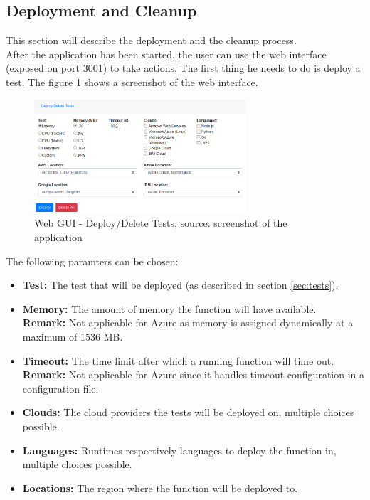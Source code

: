\subsection{Deployment and Cleanup}
This section will describe the deployment and the cleanup process.\\
After the application has been started, the user can use the web interface (exposed on port 3001) to take actions. The first thing he needs to do is deploy a test. The figure \ref{fig:ui} shows a screenshot of the web interface.

\begin{figure}[htp]
\begin{center}
\includegraphics[width=0.7\textwidth]{bilder/ui.png}
\captionsetup{justification=centering, labelfont=bf}
\caption[Web GUI - Deploy/Delete Tests]{Web GUI - Deploy/Delete Tests, source: screenshot of the application}
\label{fig:ui}
\end{center}
\end{figure}

The following paramters can be chosen:
\begin{itemize}
    \item \textbf{Test:} The test that will be deployed (as described in section \ref{sec:tests}).
    \item \textbf{Memory:} The amount of memory the function will have available.\\ \textbf{Remark:} Not applicable for Azure as memory is assigned dynamically at a maximum of 1536 \gls{MB}.
    \item \textbf{Timeout:} The time limit after which a running function will time out.\\ \textbf{Remark:} Not applicable for Azure since it handles timeout configuration in a configuration file.
    \item \textbf{Clouds:} The cloud providers the tests will be deployed on, multiple choices possible.
    \item \textbf{Languages:} Runtimes respectively languages to deploy the function in, multiple choices possible.
    \item \textbf{Locations:} The region where the function will be deployed to.
\end{itemize}

